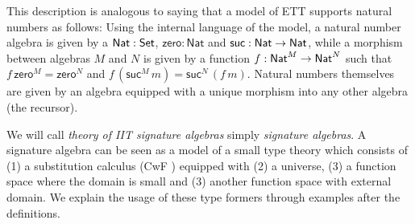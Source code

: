 \documentclass[a4paper,UKenglish,cleveref, autoref]{lipics-v2019}
\begin{document}
This description is analogous to saying that a model of ETT supports
natural numbers as follows: Using the internal language of the model,
a natural number algebra is given by a $\mathsf{Nat}:\mathsf{Set}$,
$\mathsf{zero}:\mathsf{Nat}$ and
$\mathsf{suc}:\mathsf{Nat}\rightarrow \mathsf{Nat}$, while a morphism between
algebras $M$ and $N$ is given by a function
$f:\mathsf{Nat}^M\rightarrow\mathsf{Nat}^N$ such that
$f\,\mathsf{zero}^M=\mathsf{zero}^N$ and
$f\,(\mathsf{suc}^M\,m)=\mathsf{suc}^N\,(f\,m)$. Natural numbers
themselves are given by an algebra equipped with a unique morphism
into any other algebra (the recursor).

We will call \emph{theory of IIT signature algebras} simply
\emph{signature algebras}. A signature algebra can be seen as a model
of a small type theory which consists of (1) a substitution calculus
(CwF \cite{Dybjer96internaltype}) equipped with (2) a universe, (3) a
function space where the domain is small and (3) another function
space with external domain. We explain the usage of these type
formers through examples after the definitions.
\end{document}
